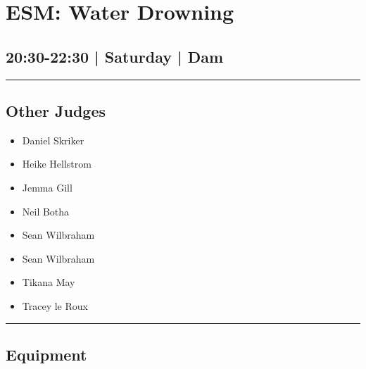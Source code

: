 \documentclass[10pt, A5]{article}
\begin{document}
        \begin{framed}
        \begin{minipage}{\textwidth}

        \setcounter{section}{45}
        \section{ESM: Water Drowning}
        \subsection*{20:30-22:30 | Saturday | Dam}

        \vspace{0.25cm}
        \hrule
        \vspace{0.25cm}


        \subsection*{Other Judges}
                    

        	\begin{multicols}{2}

		\begin{itemize}
									\item Daniel Skriker
									\item Heike Hellstrom
									\item Jemma Gill
									\item Neil Botha
									\item Sean Wilbraham
						\end{itemize}

		\vfill\null
		\columnbreak

		\begin{itemize}
									\item Sean Wilbraham
									\item Tikana May
									\item Tracey le Roux
						\end{itemize}

		\vfill\null

		\end{multicols}

    \vspace{0.25cm}
        \hrule
        \vspace{0.25cm}

        \begin{multicols}{2}

		\section*{\faWrench \: Equipment}


\end{multicols}
\end{minipage}
\end{framed}
\end{document}
